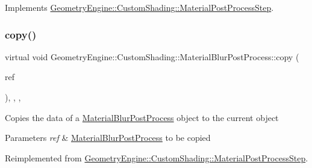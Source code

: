 Implements \mbox{\hyperlink{class_geometry_engine_1_1_custom_shading_1_1_material_post_process_step_a5fd4c17faac4fea71831868027d5a516}{Geometry\+Engine\+::\+Custom\+Shading\+::\+Material\+Post\+Process\+Step}}.

\mbox{\label{class_geometry_engine_1_1_custom_shading_1_1_material_blur_post_process_ab9890776a7a11b969f7139a6d7eba2df}} 
\subsubsection{\texorpdfstring{copy()}{copy()}}
{\footnotesize\ttfamily virtual void Geometry\+Engine\+::\+Custom\+Shading\+::\+Material\+Blur\+Post\+Process\+::copy (\begin{DoxyParamCaption}\item[{const \mbox{\hyperlink{class_geometry_engine_1_1_custom_shading_1_1_material_post_process_step}{Material\+Post\+Process\+Step}} \&}]{ref }\end{DoxyParamCaption})\hspace{0.3cm}{\ttfamily [inline]}, {\ttfamily [override]}, {\ttfamily [protected]}, {\ttfamily [virtual]}}

Copies the data of a \mbox{\hyperlink{class_geometry_engine_1_1_custom_shading_1_1_material_blur_post_process}{Material\+Blur\+Post\+Process}} object to the current object 
\begin{DoxyParams}{Parameters}
{\em ref} & \mbox{\hyperlink{class_geometry_engine_1_1_custom_shading_1_1_material_blur_post_process}{Material\+Blur\+Post\+Process}} to be copied \\
\hline
\end{DoxyParams}


Reimplemented from \mbox{\hyperlink{class_geometry_engine_1_1_custom_shading_1_1_material_post_process_step_aed622b637ae01f6a3cfa5d7f60c63ac6}{Geometry\+Engine\+::\+Custom\+Shading\+::\+Material\+Post\+Process\+Step}}.

\mbox{\label{class_geometry_engine_1_1_custom_shading_1_1_material_blur_post_process_a4f97b4db8405802c8330428685895fa4}} 
